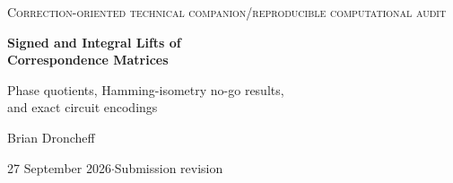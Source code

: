 \begin{titlepage}
\centering
\vspace*{11mm}
{\small\scshape Correction-oriented technical companion\quad /\quad reproducible computational audit\par}
\vspace{12mm}
{\LARGE\bfseries Signed and Integral Lifts of\\[5pt] Correspondence Matrices\par}
\vspace{6mm}
{\large Phase quotients, Hamming-isometry no-go results,\\and exact circuit encodings\par}
\vspace{12mm}
{\large Brian Droncheff\par}
\vspace{3mm}
{27 September 2026\quad $\cdot$\quad Submission revision\par}
\vspace{12mm}
\begin{minipage}{0.91\textwidth}
\begin{abstract}
This technical companion asks a narrow question: what survives if the four rotational positions of a correspondence matrix (CM) are treated as phase labels, and what must change before those labels can represent signed quantum amplitudes?  In the strict Boolean convolution algebra $\F_2[C_4]$, rotation is a faithful $C_4$ action but equal contributions cancel under XOR.  An elementary classification, corroborated by exhaustive enumeration of all $65{,}536$ two-branch $\F_2[C_4]$-linear operators, shows that global preservation of the coefficient Hamming weight leaves only the $32$ branch permutations with independent cyclic rotations; the full integer pair-correlation condition gives the same class.  A specified weight-four shell has $512$ preservers, but none produces the target four-sample fringe in the tested interferometer.


\end{abstract}
\end{minipage}
\end{titlepage}
